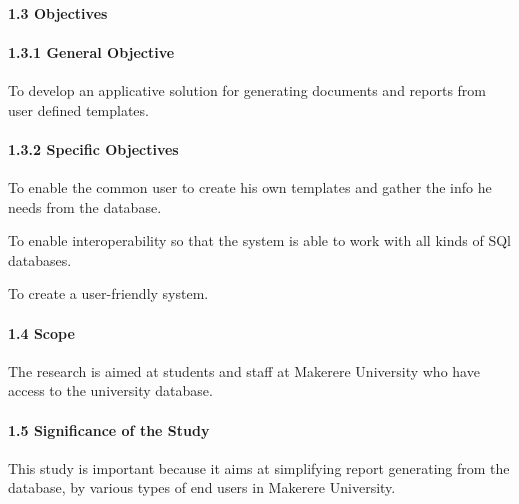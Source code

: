 \documentclass[10pt,a4paper]{report}
\begin{document}
\paragraph{1.3	Objectives}
\paragraph{1.3.1  General Objective}
\begin{flushleft}
To develop an applicative solution for generating documents and reports from user defined templates.
\end{flushleft}

\paragraph{1.3.2  Specific Objectives}
\begin{flushleft}
To enable the common user to create his own templates and gather the info he needs from the database.
\end{flushleft}

\begin{flushleft}
To enable interoperability so that the system is able to work with all kinds of SQl databases.
\end{flushleft}

\begin{flushleft}
To create a user-friendly system.
\end{flushleft}

\paragraph{1.4  Scope}
\begin{flushleft}
The research is aimed at students and staff at Makerere University who have access to the university database. 
\end{flushleft}

\paragraph{1.5  Significance of the Study}
\begin{flushleft}
This study is important because it aims at simplifying report generating from the database, by various types of end users in Makerere University.
\end{flushleft}
\end{document}
